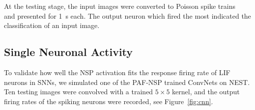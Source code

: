 	At the testing stage, the input images were converted to Poisson spike trains~\citep{liu2016bench} and presented for 1~s each.
	The output neuron which fired the most indicated the classification of an input image.
%	
%	

	
	\subsection{Single Neuronal Activity}
	\label{subsec:compareAF}
	To validate how well the NSP activation fits the response firing rate of LIF neurons in SNNs, we simulated one of the PAF-NSP trained ConvNets on NEST.
	Ten testing images were \DIFaddbegin {}\DIFaddend convolved with a trained $5\times5$ kernel, and the output firing rates of the spiking neurons were recorded, see Figure~\ref{fig:cnn}.

